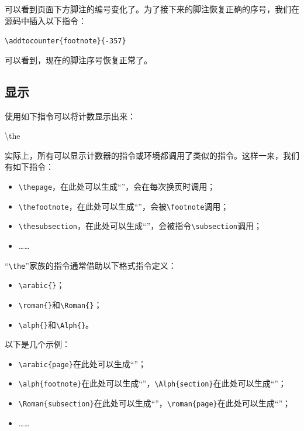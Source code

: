 \addtocounter{footnote}{357}
可以看到页面下方脚注的编号变化了。为了接下来的脚注恢复正确的序号，我们在源码中插入以下指令：

\begin{dmd}
  \verb|\addtocounter{footnote}{-357}|
\end{dmd}

\addtocounter{footnote}{-357}
可以看到，现在的脚注序号恢复正常了。

\subsection{显示}

使用如下指令可以将计数显示出来：

\begin{dmd}
\backslash the
\end{dmd}

实际上，所有可以显示计数器的指令或环境都调用了类似的指令。这样一来，我们有如下指令：

\begin{itemize}
  \item \verb|\thepage|，在此处可以生成“\thepage ”，会在每次换页时调用；
  \item \verb|\thefootnote|，在此处可以生成“\thefootnote ”，会被\verb|\footnote|调用；
  \item \verb|\thesubsection|，在此处可以生成“\thesubsection ”，会被指令\verb|\subsection|调用；
  \item ……
\end{itemize}

“\verb|\the|”家族的指令通常借助以下格式指令定义：

\begin{itemize}
  \item \verb|\arabic{|\verb|}|；
  \item \verb|\roman{|\verb|}|和\verb|\Roman{|\verb|}|；
  \item \verb|\alph{|\verb|}|和\verb|\Alph{|\verb|}|。
\end{itemize}

以下是几个示例：

\begin{itemize}
  \item \verb|\arabic{page}|在此处可以生成“”；
  \item \verb|\alph{footnote}|在此处可以生成“”，\verb|\Alph{section}|在此处可以生成“”；
  \item \verb|\Roman{subsection}|在此处可以生成“”，\verb|\roman{page}|在此处可以生成“”；
  \item ……
\end{itemize}

